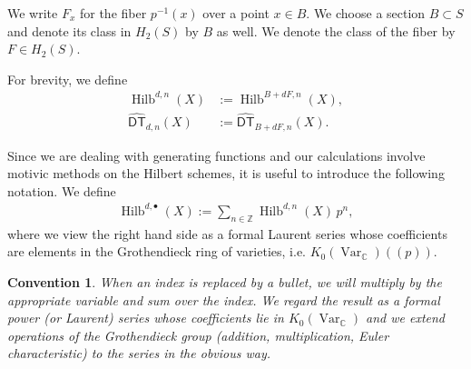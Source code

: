 \documentclass[12pt]{amsart}
\newtheorem{convention}{Convention}[theorem]
\theoremstyle{definition}
\newcommand{\CC} {\mathbb{C}}          %
\newcommand{\ZZ} {\mathbb{Z}}		%
\newcommand{\Hilb}{\operatorname{Hilb}}
\newcommand{\DT}{\mathsf{DT}}
\newcommand{\Var}{\operatorname{Var}}
\newcommand{\conn}{\operatorname{conn}}
\newcommand{\DThat}{\widehat{\DT}}
\begin{document}
We write $F_x$ for the fiber $p^{-1}(x)$ over a  point $x \in
B$. We choose a section $B \subset S$ and denote its class in $H_2(S)$
by $B$ as well. We denote the class of the fiber by $F \in H_2(S)$.


For brevity, we define
\begin{align*}
\Hilb^{d,n}(X) &:=\Hilb^{B+dF,n}(X), \\
\DThat _{d,n}(X) &:= \DThat_{B+dF,n}(X).
\end{align*}


\begin{comment}
The generating functions of interest are
\begin{align*}
\DT(X) &:= \sum_{d \geq 0} \DT_d(X) \, q^d := \sum_{d \geq 0} \sum_{n \in \ZZ} \DT_{d,n}(X) \, (-p)^n q^d, \\
\DThat (X) &:= \sum_{d \geq 0} \DThat _d(X) \, q^d := \sum_{d \geq 0} \sum_{n \in \ZZ} \DThat _{d,n}(X) \, p^n q^d.
\end{align*}
The corresponding connected series $\DT^{\conn}(X)$ and $\DThat ^{\conn}(X)$ are obtained after dividing by
\begin{align*}
&\sum_{d \geq 0} \sum_{n \in \ZZ} e(\Hilb^{dF,n}(X),\nu) \, (-p)^n q^d, \\
&\sum_{d \geq 0} \sum_{n \in \ZZ} e(\Hilb^{dF,n}(X)) \, p^n q^d,
\end{align*}
respectively.
\end{comment}

Since we are dealing with generating functions and our calculations
involve motivic methods on the Hilbert schemes, it is useful to
introduce the following notation. We define
\begin{align*}
\Hilb^{d,\bullet}(X) := \sum_{n \in \ZZ} \Hilb^{d,n}(X) \, p^n,
\end{align*}
where we view the right hand side as a formal Laurent series whose
coefficients are elements in the Grothendieck ring of varieties,
i.e. $K_0(\Var_{\CC})(\!(p)\!)$.



\begin{convention}\label{conv: bullet convention}
When an index is replaced by a bullet, we will multiply by the
appropriate variable and sum over the index. We regard the result as a
formal power (or Laurent) series whose coefficients lie in
$K_{0}(\Var_{\CC})$ and we extend operations of the Grothendieck group
(addition, multiplication, Euler characteristic) to the series in the
obvious way.
\end{convention}
\end{document}

